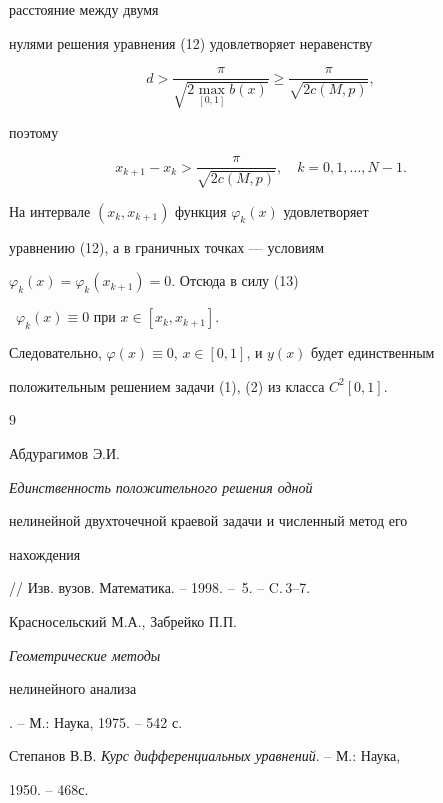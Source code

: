 \begin{pf}
расстояние между двумя


нулями решения уравнения (12) удовлетворяет неравенству


$$


d> \frac{\pi}{\sqrt{2\max\limits_{[0,1]}b(x)}}\geq


\frac{\pi}{\sqrt{2c(M,p)}},


$$


поэтому


\begin{equation}


x_{k+1}-x_k>\frac{\pi} 


{\sqrt{2c(M,p)}},\quad k=0,1,\dotsc,N-1.


\end{equation}


 


На интервале $(x_k, x_{k+1})$ функция $\varphi_k(x)$ удовлетворяет 


уравнению (12), а в граничных точках --- условиям 


$\varphi_k(x)=\varphi_k(x_{k+1})=0$. Отсюда в силу (13)


\ $\varphi_k(x) \equiv 0$ при $x\in [x_k,x_{k+1}]$.


Следовательно, $\varphi(x)\equiv0$, $x\in[0,1]$, и $y(x)$ будет единственным


положительным решением задачи (1), (2) из класса $C^2[0,1]$.


\end{pf}








\begin{thebibliography}{9}







Абдурагимов Э.И. {\em Единственность положительного решения одной


нелинейной двухточечной краевой задачи и численный метод его


нахождения} // Изв. вузов. Математика. -- 1998. -- \No\,5. -- C.\,3--7.




Красносельский М.А., Забрейко П.П. {\em Геометрические методы


нелинейного анализа}. -- М.: Наука, 1975. -- 542 с.




Степанов В.В. {\em Курс дифференциальных уравнений}. -- М.: Наука,


1950. -- 468с.





\end{thebibliography}





